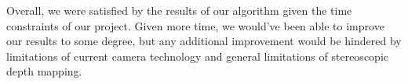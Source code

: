 Overall, we were satisfied by the results of our algorithm given the time constraints of our project. Given more time, we would've been able to improve our results to some degree, but any additional improvement would be hindered by limitations of current camera technology and general limitations of stereoscopic depth mapping. 